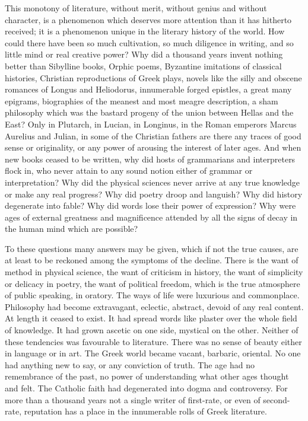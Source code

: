 \documentclass[11pt,letter]{article}
\begin{document}
\par  This monotony of literature, without merit, without genius and without character, is a phenomenon which deserves more attention than it has hitherto received; it is a phenomenon unique in the literary history of the world. How could there have been so much cultivation, so much diligence in writing, and so little mind or real creative power? Why did a thousand years invent nothing better than Sibylline books, Orphic poems, Byzantine imitations of classical histories, Christian reproductions of Greek plays, novels like the silly and obscene romances of Longus and Heliodorus, innumerable forged epistles, a great many epigrams, biographies of the meanest and most meagre description, a sham philosophy which was the bastard progeny of the union between Hellas and the East? Only in Plutarch, in Lucian, in Longinus, in the Roman emperors Marcus Aurelius and Julian, in some of the Christian fathers are there any traces of good sense or originality, or any power of arousing the interest of later ages. And when new books ceased to be written, why did hosts of grammarians and interpreters flock in, who never attain to any sound notion either of grammar or interpretation? Why did the physical sciences never arrive at any true knowledge or make any real progress? Why did poetry droop and languish? Why did history degenerate into fable? Why did words lose their power of expression? Why were ages of external greatness and magnificence attended by all the signs of decay in the human mind which are possible?

\par  To these questions many answers may be given, which if not the true causes, are at least to be reckoned among the symptoms of the decline. There is the want of method in physical science, the want of criticism in history, the want of simplicity or delicacy in poetry, the want of political freedom, which is the true atmosphere of public speaking, in oratory. The ways of life were luxurious and commonplace. Philosophy had become extravagant, eclectic, abstract, devoid of any real content. At length it ceased to exist. It had spread words like plaster over the whole field of knowledge. It had grown ascetic on one side, mystical on the other. Neither of these tendencies was favourable to literature. There was no sense of beauty either in language or in art. The Greek world became vacant, barbaric, oriental. No one had anything new to say, or any conviction of truth. The age had no remembrance of the past, no power of understanding what other ages thought and felt. The Catholic faith had degenerated into dogma and controversy. For more than a thousand years not a single writer of first-rate, or even of second-rate, reputation has a place in the innumerable rolls of Greek literature.
\end{document}
